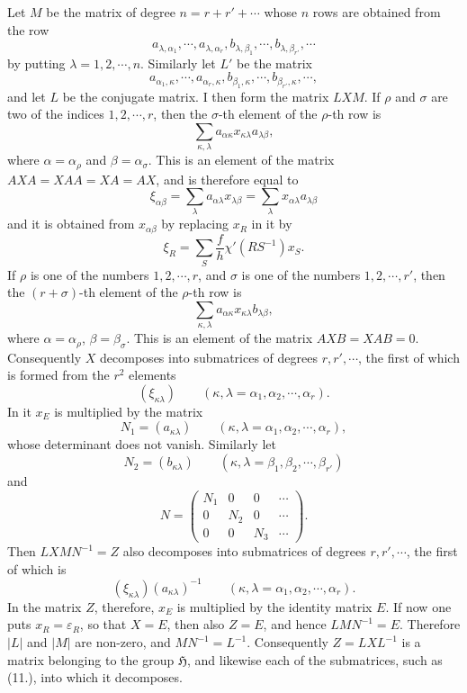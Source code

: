\documentclass[11pt]{article}
\newcommand{\Hgr}{\mathfrak{H}}
\newcommand{\eps}{\varepsilon}
\begin{document}
Let $M$ be the matrix of degree $n=r+r'+\cdots$ whose $n$ rows are obtained from the row
\[
a_{\lambda,\alpha_1},\cdots,a_{\lambda,\alpha_r},
 b_{\lambda,\beta_1},\cdots,b_{\lambda,\beta_{r'}},\cdots
\]
by putting $\lambda=1,2,\cdots,n$. Similarly let $L'$ be the matrix
\[
a_{\alpha_1,\kappa},\cdots,a_{\alpha_r,\kappa},
 b_{\beta_1,\kappa},\cdots,b_{\beta_{r'},\kappa},\cdots,
\]
and let $L$ be the conjugate matrix. I then form the matrix $LXM$. If $\rho$ and $\sigma$ are two of the indices $1,2,\cdots,r$, then the $\sigma$-th element of the $\rho$-th row is
\[
\sum_{\kappa,\lambda}a_{\alpha\kappa}x_{\kappa\lambda}a_{\lambda\beta},
\]
where $\alpha=\alpha_\rho$ and $\beta=\alpha_\sigma$. This is an element of the matrix $AXA=XAA=XA=AX$, and is therefore equal to
\begin{equation}\tag{9.}
\xi_{\alpha\beta}=\sum_\lambda a_{\alpha\lambda}x_{\lambda\beta}
=\sum_\lambda x_{\alpha\lambda}a_{\lambda\beta}
\end{equation}
and it is obtained from $x_{\alpha\beta}$ by replacing $x_R$ in it by
\begin{equation}\tag{10.}
\xi_R=\sum_S \frac{f}{h}\chi'(RS^{-1})x_S.
\end{equation}
If $\rho$ is one of the numbers $1,2,\cdots,r$, and $\sigma$ is one of the numbers $1,2,\cdots,r'$, then the $(r+\sigma)$-th element of the $\rho$-th row is
\[
\sum_{\kappa,\lambda}a_{\alpha\kappa}x_{\kappa\lambda}b_{\lambda\beta},
\]
where $\alpha=\alpha_\rho$, $\beta=\beta_\sigma$. This is an element of the matrix $AXB=XAB=0$. Consequently $X$ decomposes into submatrices of degrees $r,r',\cdots$, the first of which is formed from the $r^2$ elements
\[
(\xi_{\kappa\lambda})\qquad(\kappa,\lambda=\alpha_1,\alpha_2,\cdots,\alpha_r).
\]
In it $x_E$ is multiplied by the matrix
\[
N_1=(a_{\kappa\lambda})\qquad(\kappa,\lambda=\alpha_1,\alpha_2,\cdots,
\alpha_r),
\]
whose determinant does not vanish. Similarly let
\[
N_2=(b_{\kappa\lambda})\qquad(\kappa,\lambda=\beta_1,\beta_2,\cdots,
\beta_{r'})
\]
and
\[
N=\begin{pmatrix}
N_1&0&0&\cdots\\
0&N_2&0&\cdots\\
0&0&N_3&\cdots
\end{pmatrix}.
\]
Then $LXMN^{-1}=Z$ also decomposes into submatrices of degrees $r,r',\cdots$, the first of which is
\begin{equation}\tag{11.}
(\xi_{\kappa\lambda})(a_{\kappa\lambda})^{-1}
\qquad(\kappa,\lambda=\alpha_1,\alpha_2,\cdots,\alpha_r).
\end{equation}
In the matrix $Z$, therefore, $x_E$ is multiplied by the identity matrix $E$. If now one puts $x_R=\eps_R$, so that $X=E$, then also $Z=E$, and hence $LMN^{-1}=E$. Therefore $|L|$ and $|M|$ are non-zero, and $MN^{-1}=L^{-1}$. Consequently $Z=LXL^{-1}$ is a matrix belonging to the group $\Hgr$, and likewise each of the submatrices, such as (11.), into which it decomposes.
\end{document}
